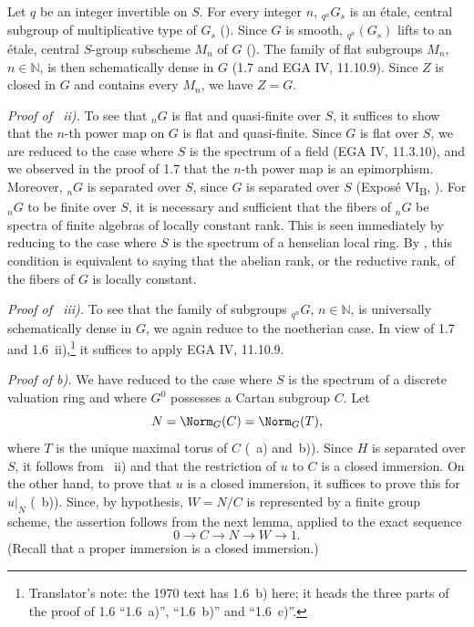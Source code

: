 Let \(q\) be an integer invertible on \(S\). For every integer \(n\),
\({}_{q^n}G_s\) is an étale, central subgroup of multiplicative type
of \(G_s\) (). Since \(G\) is smooth,
\({}_{q^n}(G_s)\) lifts to an étale, central \(S\)-group subscheme
\(M_n\) of \(G\) (). The family of flat subgroups
\(M_n\), \(n\in\mathbb N\), is then schematically dense in \(G\)
(1.7 and EGA IV, 11.10.9). Since \(Z\) is closed in \(G\) and
contains every \(M_n\), we have \(Z=G\).

\smallskip
\noindent\textit{Proof of ~ii).}
To see that \({}_{n}G\) is flat and quasi-finite over \(S\), it
suffices to show that the \(n\)-th power map on \(G\) is flat and
quasi-finite. Since \(G\) is flat over \(S\), we are reduced to the
case where \(S\) is the spectrum of a field (EGA IV, 11.3.10), and
we observed in the proof of 1.7 that the \(n\)-th power map is an
epimorphism. Moreover, \({}_{n}G\) is separated over \(S\), since
\(G\) is separated over \(S\) (Exposé VI\textsubscript{B}, ).
For \({}_{n}G\) to be finite over \(S\), it is necessary and
sufficient that the fibers of \({}_{n}G\) be spectra of finite
algebras of locally constant rank. This is seen immediately by
reducing to the case where \(S\) is the spectrum of a henselian local
ring. By , this condition is equivalent to saying that the abelian
rank, or the reductive rank, of the fibers of \(G\) is locally
constant.

\smallskip
\noindent\textit{Proof of ~iii).}
To see that the family of subgroups
\({}_{q^n}G\), \(n\in\mathbb N\), is universally schematically dense
in \(G\), we again reduce to the noetherian case. In view of 1.7 and
1.6~ii),\footnote{Translator's note: the 1970 text has 1.6~b) here; it heads the three parts of the
proof of 1.6 ``1.6~a)'', ``1.6~b)'' and ``1.6~c)''.} it suffices to apply EGA IV, 11.10.9.

\medskip
\noindent\textit{Proof of  b).}
We have reduced to the case where \(S\) is the spectrum of a discrete
valuation ring and where \(G^0\) possesses a Cartan subgroup \(C\).
Let
\[
  N=\Norm_G(C)=\Norm_G(T),
\]
where \(T\) is the unique maximal torus of \(C\) (~a) and~b)). Since \(H\) is separated over \(S\), it follows from
~ii) and  that the restriction of \(u\) to \(C\)
is a closed immersion. On the other hand, to prove that \(u\) is a
closed immersion, it suffices to prove this for \(u|_N\) (~b)).
Since, by hypothesis, \(W=N/C\) is represented by a finite group
scheme, the assertion follows from the next lemma, applied to the
exact sequence
\[
  0\longrightarrow C\longrightarrow N\longrightarrow W
  \longrightarrow 1.
\]
(Recall that a proper immersion is a closed immersion.)

